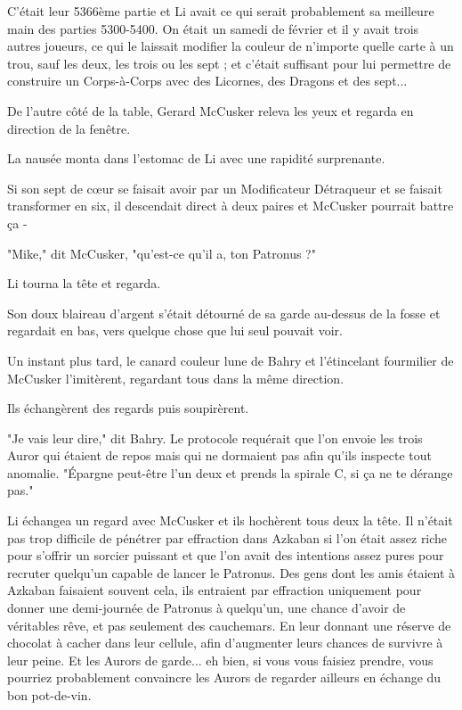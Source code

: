 C'était leur 5366ème partie et Li avait ce qui serait probablement sa meilleure main des parties 5300-5400. On était un samedi de février et il y avait trois autres joueurs, ce qui le laissait modifier la couleur de n'importe quelle carte à un trou, sauf les deux, les trois ou les sept ; et c'était suffisant pour lui permettre de construire un Corps-à-Corps avec des Licornes, des Dragons et des sept...

De l'autre côté de la table, Gerard McCusker releva les yeux et regarda en direction de la fenêtre.

La nausée monta dans l'estomac de Li avec une rapidité surprenante.

Si son sept de cœur se faisait avoir par un Modificateur Détraqueur et se faisait transformer en six, il descendait direct à deux paires et McCusker pourrait battre ça -

"Mike," dit McCusker, "qu'est-ce qu'il a, ton Patronus ?"

Li tourna la tête et regarda.

Son doux blaireau d'argent s'était détourné de sa garde au-dessus de la fosse et regardait en bas, vers quelque chose que lui seul pouvait voir.

Un instant plus tard, le canard couleur lune de Bahry et l'étincelant fourmilier de McCusker l'imitèrent, regardant tous dans la même direction.

Ils échangèrent des regards puis soupirèrent.

"Je vais leur dire," dit Bahry. Le protocole requérait que l'on envoie les trois Auror qui étaient de repos mais qui ne dormaient pas afin qu'ils inspecte tout anomalie. "Épargne peut-être l'un deux et prends la spirale C, si ça ne te dérange pas."

Li échangea un regard avec McCusker et ils hochèrent tous deux la tête. Il n'était pas trop difficile de pénétrer par effraction dans Azkaban si l'on était assez riche pour s'offrir un sorcier puissant et que l'on avait des intentions assez pures pour recruter quelqu'un capable de lancer le Patronus. Des gens dont les amis étaient à Azkaban faisaient souvent cela, ils entraient par effraction uniquement pour donner une demi-journée de Patronus à quelqu'un, une chance d'avoir de véritables rêve, et pas seulement des cauchemars. En leur donnant une réserve de chocolat à cacher dans leur cellule, afin d'augmenter leurs chances de survivre à leur peine. Et les Aurors de garde... eh bien, si vous vous faisiez prendre, vous pourriez probablement convaincre les Aurors de regarder ailleurs en échange du bon pot-de-vin.

